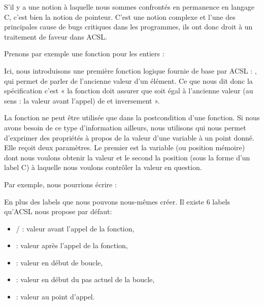 

S'il y a une notion à laquelle nous sommes confrontés en permanence en 
langage C, c'est bien la notion de pointeur. C'est une notion complexe et 
l'une des principales cause de bugs critiques dans les programmes, ils ont 
donc droit à un traitement de faveur dans ACSL.



Prenons par exemple une fonction  pour les entiers :








Ici, nous introduisons une première fonction logique fournie de base par 
ACSL : , qui permet de parler de l'ancienne valeur d'un élément. 
Ce que nous dit donc la spécification c'est « la fonction doit assurer que
 soit égal à l'ancienne valeur (au sens : la valeur avant l'appel) de 
et inversement ».



La fonction  ne peut être utilisée que dans la postcondition d'une
fonction. Si nous avons besoin de ce type d'information ailleurs, nous 
utilisons  qui nous permet d'exprimer des propriétés à propos de la 
valeur d'une variable à un point donné. Elle reçoit deux paramètres. Le premier 
est la variable (ou position mémoire) dont nous voulons obtenir la valeur et le 
second la position (sous la forme d'un label C) à laquelle nous voulons 
contrôler la valeur en question.



Par exemple, nous pourrions écrire :






En plus des labels que nous pouvons nous-mêmes créer. Il existe 6 labels 
qu'ACSL nous propose par défaut:



\begin{itemize}
\item {}/ : valeur avant l'appel de la fonction,
\item {} : valeur après l'appel de la fonction,
\item {} : valeur en début de boucle,
\item {} : valeur en début du pas actuel de la boucle,
\item {} : valeur au point d'appel.
\end{itemize}


